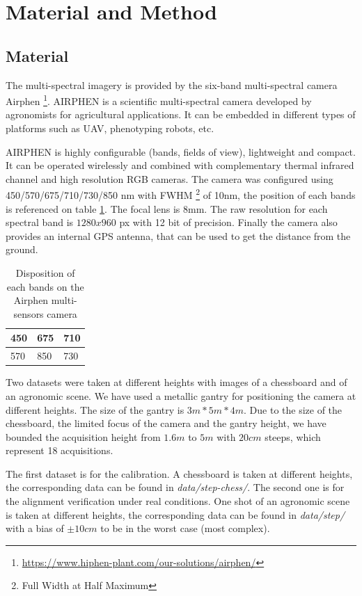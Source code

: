 \documentclass[]{elsarticle}
\begin{document}
	\newpage
	\section{Material and Method}
	
	\subsection{Material}
	
	The multi-spectral imagery is provided by the six-band multi-spectral camera Airphen \footnote{\url{https://www.hiphen-plant.com/our-solutions/airphen/}}.
	AIRPHEN is a scientific multi-spectral camera developed by agronomists for agricultural applications.
	It can be embedded in different types of platforms such as UAV, phenotyping robots, etc.
	\\
	\par AIRPHEN is highly configurable (bands, fields of view), lightweight and compact.
	It can be operated wirelessly and combined with complementary thermal infrared channel and high resolution RGB cameras.
	The camera was configured using 450/570/675/710/730/850 nm with FWHM \footnote{Full Width at Half Maximum} of 10nm, the position of each bands is referenced on table \ref{tab:bands-disposition}.
	The focal lens is 8mm. The raw resolution for each spectral band is $1280x960$ px with 12 bit of precision.
	Finally the camera also provides an internal GPS antenna, that can be used to get the distance from the ground.
	
	\begin{table}[H]
		\begin{tabularx}{\linewidth}{|X|X|X|}
			\hline
			450 & 675 & 710 \\
			\hline
			570 & 850 & 730 \\
			\hline
		\end{tabularx}
		\label{tab:bands-disposition}
		\caption{Disposition of each bands on the Airphen multi-sensors camera}
	\end{table}
	
	\par Two datasets were taken at different heights with images of a chessboard and of an agronomic scene.
	We have used a metallic gantry for positioning the camera at different heights.
	The size of the gantry is $3m * 5m * 4m$.
	Due to the size of the chessboard, the limited focus of the camera and the gantry height,
	we have bounded the acquisition height from $1.6m$ to $5m$ with $20cm$ steeps, which represent 18 acquisitions.
	\\
	\par The first dataset is for the calibration. A chessboard is taken at different heights, the corresponding data can be found in \textit{data/step-chess/}.
	The second one is for the alignment verification under real conditions.
	One shot of an agronomic scene is taken at different heights, the corresponding data can be found in \textit{data/step/}
	with a bias of $\pm 10cm$ to be in the worst case (most complex).
	
\end{document}
